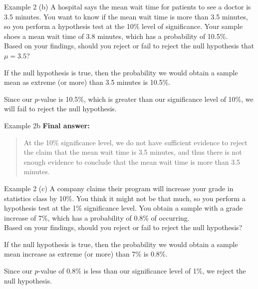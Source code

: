 \documentclass[t]{beamer}
\begin{document}
\begin{frame}{Example 2}
(b) \quad A hospital says the mean wait time for patients to see a doctor is 3.5 minutes. You want to know if the mean wait time is more than 3.5 minutes, so you perform a hypothesis test at the 10\% level of significance. Your sample shoes a mean wait time of 3.8 minutes, which has a probability of 10.5\%.	\newline\\
Based on your findings, should you reject or fail to reject the null hypothesis that $\mu = 3.5$?	\newline\\	\pause

If the null hypothesis is true, then the probability we would obtain a sample mean as extreme (or more) than 3.5 minutes is 10.5\%. \newline\\	\pause

Since our $p$-value is 10.5\%, which is greater than our significance level of 10\%, we will fail to reject the null hypothesis.
\end{frame}

\begin{frame}{Example 2b}
\textbf{Final answer:}
\begin{quote}
At the 10\% significance level, we do not have sufficient evidence to reject the claim that the mean wait time is 3.5 minutes, and thus there is not enough evidence to conclude that the mean wait time is more than 3.5 minutes.
\end{quote}
\end{frame}

\begin{frame}{Example 2}
(c) \quad A company claims their program will increase your grade in statistics class by 10\%. You think it might not be that much, so you perform a hypothesis test at the 1\% significance level. You obtain a sample with a grade increase of 7\%, which has a probability of 0.8\% of occurring. \newline\\

Based on your findings, should you reject or fail to reject the null hypothesis?	\newline\\	\pause

If the null hypothesis is true, then the probability we would obtain a sample mean increase as extreme (or more) than 7\% is 0.8\%. \newline\\	\pause

Since our $p$-value of 0.8\% is less than our significance level of 1\%, we reject the null hypothesis.
\end{frame}
\end{document}
